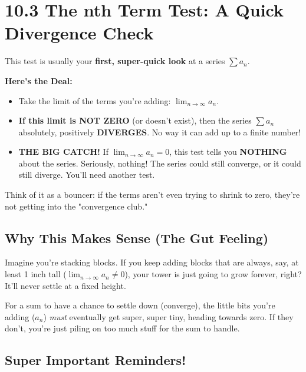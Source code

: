 \documentclass{article}
\begin{document}
\newpage
\section{10.3 The nth Term Test: A Quick Divergence Check}

\begin{tcolorbox}[colback=blue!5!white,colframe=blue!75!black,title=The Main Idea: Does it Even Try to Stop?]
This test is usually your \textbf{first, super-quick look} at a series \(\sum a_n\).

\textbf{Here's the Deal:}
\begin{itemize}
    \item Take the limit of the terms you're adding: \(\lim_{n\to\infty} a_n\).
    \item \textbf{If this limit is NOT ZERO} (or doesn't exist), then the series \(\sum a_n\) absolutely, positively \textbf{DIVERGES}. No way it can add up to a finite number!
    \item \textbf{THE BIG CATCH!} If \(\lim_{n\to\infty} a_n = 0\), this test tells you \textbf{NOTHING} about the series. Seriously, nothing! The series could still converge, or it could still diverge. You'll need another test.
\end{itemize}
Think of it as a bouncer: if the terms aren't even trying to shrink to zero, they're not getting into the "convergence club."
\end{tcolorbox}

\subsection*{Why This Makes Sense (The Gut Feeling)}
Imagine you're stacking blocks. If you keep adding blocks that are always, say, at least 1 inch tall (\(\lim_{n\to\infty} a_n \neq 0\)), your tower is just going to grow forever, right? It'll never settle at a fixed height.

For a sum to have a chance to settle down (converge), the little bits you're adding (\(a_n\)) \textit{must} eventually get super, super tiny, heading towards zero. If they don't, you're just piling on too much stuff for the sum to handle.

\subsection*{Super Important Reminders!}
\end{document}
